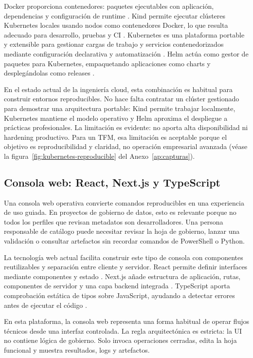 Docker proporciona contenedores: paquetes ejecutables con aplicación, dependencias y configuración de runtime \cite{dockerOverview}. Kind permite ejecutar clústeres Kubernetes locales usando nodos como contenedores Docker, lo que resulta adecuado para desarrollo, pruebas y CI \cite{kindDocs}. Kubernetes es una plataforma portable y extensible para gestionar cargas de trabajo y servicios contenedorizados mediante configuración declarativa y automatización \cite{kubernetesConcepts}. Helm actúa como gestor de paquetes para Kubernetes, empaquetando aplicaciones como charts y desplegándolas como releases \cite{helmDocs}.

En el estado actual de la ingeniería cloud, esta combinación es habitual para construir entornos reproducibles. No hace falta contratar un clúster gestionado para demostrar una arquitectura portable: Kind permite trabajar localmente, Kubernetes mantiene el modelo operativo y Helm aproxima el despliegue a prácticas profesionales. La limitación es evidente: no aporta alta disponibilidad ni hardening productivo. Para un TFM, esa limitación es aceptable porque el objetivo es reproducibilidad y claridad, no operación empresarial avanzada (véase la figura~\ref{fig:kubernetes-reproducible} del Anexo~\ref{ap:capturas}).

\subsection{Consola web: React, Next.js y TypeScript}

Una consola web operativa convierte comandos reproducibles en una experiencia de uso guiada. En proyectos de gobierno de datos, esto es relevante porque no todos los perfiles que revisan metadatos son desarrolladores. Una persona responsable de catálogo puede necesitar revisar la hoja de gobierno, lanzar una validación o consultar artefactos sin recordar comandos de PowerShell o Python.

La tecnología web actual facilita construir este tipo de consola con componentes reutilizables y separación entre cliente y servidor. React permite definir interfaces mediante componentes y estado \cite{reactDocs}. Next.js añade estructura de aplicación, rutas, componentes de servidor y una capa backend integrada \cite{nextjsDocs}. TypeScript aporta comprobación estática de tipos sobre JavaScript, ayudando a detectar errores antes de ejecutar el código \cite{typescriptHandbook}.

En esta plataforma, la consola web representa una forma habitual de operar flujos técnicos desde una interfaz controlada. La regla arquitectónica es estricta: la UI no contiene lógica de gobierno. Solo invoca operaciones cerradas, edita la hoja funcional y muestra resultados, logs y artefactos.

